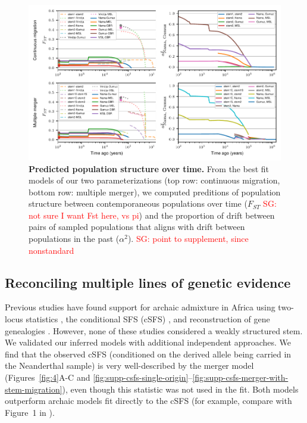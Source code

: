 \documentclass{article}
\newcommand{\sgcomment}[1]{{\textcolor{red}{SG: #1}}}
\begin{document}
\begin{figure}[t!]
    \centering
    \includegraphics{figures/fig3.pdf}
    \caption{
        \textbf{Predicted population structure over time.}
        From the best fit models of our two parameterizations (top row:
        continuous migration, bottom row: multiple merger), we computed
        preditions of population structure between contemporaneous populations
        over time ($F_{ST}$ \sgcomment{not sure I want Fst here, vs pi}) and the proportion of drift between pairs of sampled
        populations that aligns with drift between populations in the past
        ($\alpha^2$). \sgcomment{point to supplement, since nonstandard}
    }
    \label{fig:3}
\end{figure}

\subsection*{Reconciling multiple lines of genetic evidence}

Previous studies have found support for archaic admixture in Africa using
two-locus statistics \citep{Hsieh2016-gk,Ragsdale2019-nt}, the conditional SFS
(cSFS) \citep{Durvasula2020-td}, and reconstruction of gene genealogies
\citep{Speidel2019-nj}. However, none of these studies considered a weakly
structured stem. We validated our inferred models with additional independent
approaches. We find that the observed cSFS (conditioned on the derived allele
being carried in the Neanderthal sample) is very well-described by the merger
model (Figures~\ref{fig:4}A-C and
\ref{fig:supp-csfs-single-origin}--\ref{fig:supp-csfs-merger-with-stem-migration}),
even though this statistic was not used in the fit. Both models outperform
archaic models fit directly to the cSFS (for example, compare with Figure~1 in
\citet{Durvasula2020-td}).
\end{document}
